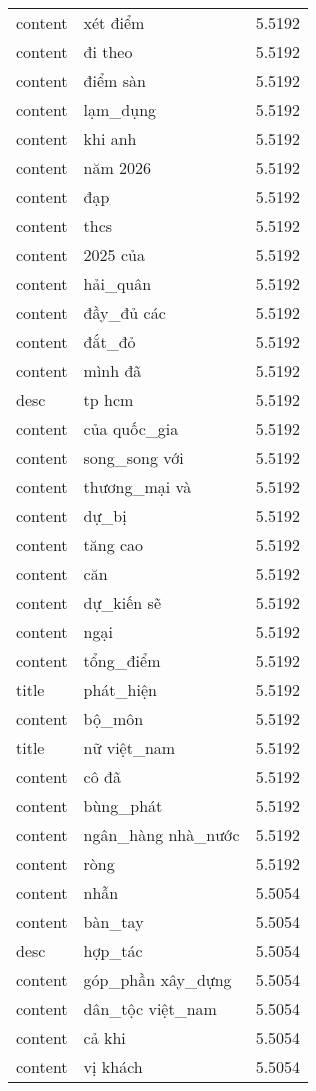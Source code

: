 \documentclass{article}
\begin{document}
\begin{tabular}{lll}
content & xét điểm & 5.5192\\
content & đi theo & 5.5192\\
content & điểm sàn & 5.5192\\
content & lạm\_dụng & 5.5192\\
content & khi anh & 5.5192\\
content & năm 2026 & 5.5192\\
content & đạp & 5.5192\\
content & thcs & 5.5192\\
content & 2025 của & 5.5192\\
content & hải\_quân & 5.5192\\
content & đầy\_đủ các & 5.5192\\
content & đắt\_đỏ & 5.5192\\
content & mình đã & 5.5192\\
desc & tp hcm & 5.5192\\
content & của quốc\_gia & 5.5192\\
content & song\_song với & 5.5192\\
content & thương\_mại và & 5.5192\\
content & dự\_bị & 5.5192\\
content & tăng cao & 5.5192\\
content & căn & 5.5192\\
content & dự\_kiến sẽ & 5.5192\\
content & ngại & 5.5192\\
content & tổng\_điểm & 5.5192\\
title & phát\_hiện & 5.5192\\
content & bộ\_môn & 5.5192\\
title & nữ việt\_nam & 5.5192\\
content & cô đã & 5.5192\\
content & bùng\_phát & 5.5192\\
content & ngân\_hàng nhà\_nước & 5.5192\\
content & ròng & 5.5192\\
content & nhẫn & 5.5054\\
content & bàn\_tay & 5.5054\\
desc & hợp\_tác & 5.5054\\
content & góp\_phần xây\_dựng & 5.5054\\
content & dân\_tộc việt\_nam & 5.5054\\
content & cả khi & 5.5054\\
content & vị khách & 5.5054\\

\end{tabular}
\end{document}

